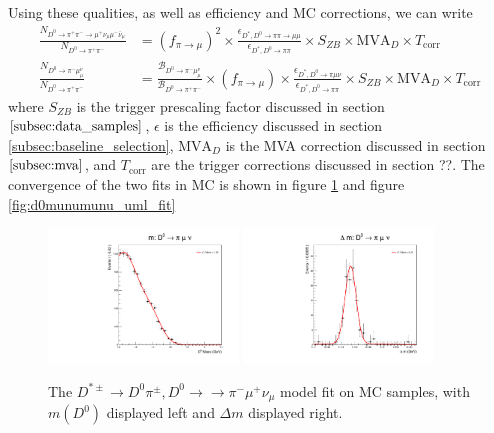 Using these qualities, as well as efficiency and MC corrections, we can write
\begin{equation}
\begin{split}
    \frac{N_{D^0 \to \pi^+ \pi^- \to \mu^+ \nu_\mu \mu^- \bar{\nu}_\mu}}{N_{D^0 \to \pi^+ \pi^-}} &= \left(f_{\pi \to \mu}\right)^2 \times \frac{\epsilon_{D^*, D^0\to\pi\pi\to\mu\mu}}{\epsilon_{D^*, D^0\to\pi\pi}} \times S_{ZB} \times \text{MVA}_D \times T_{\text{corr}} \\
    \frac{N_{D^0 \to \pi^- \mu^ \nu_\mu}}{N_{D^0 \to \pi^+ \pi^-}} &=\frac{\mathcal{B}_{D^0 \to \pi^- \mu^ \nu_\mu}}{\mathcal{B}_{D^0 \to \pi^+ \pi^-}} \times \left(f_{\pi \to \mu}\right) \times \frac{\epsilon_{D^*, D^0\to\pi\mu\nu}}{\epsilon_{D^*, D^0\to\pi\pi}} \times S_{ZB} \times \text{MVA}_D \times T_{\text{corr}}
    \label{eq:peaking_background_yield_calculation}
\end{split}
\end{equation}
where $S_{ZB}$ is the trigger prescaling factor discussed in section $\ref{subsec:data_samples}$, $\epsilon$ is the efficiency discussed in section \ref{subsec:baseline_selection}, $\text{MVA}_D$ is the MVA correction discussed in section $\ref{subsec:mva}$, and $T_{\text{corr}}$ are the trigger corrections discussed in section ??. The convergence of the two fits in MC is shown in figure \ref{fig:d0pimunu_uml_fit} and figure \ref{fig:d0munumunu_uml_fit}


\begin{figure}[htp]
    \begin{center}
      \includegraphics[width=0.45\textwidth]{figures/chapter4/signal_fit/d0pimunu_2022_2023_0_m.pdf}
      \includegraphics[width=0.45\textwidth]{figures/chapter4/signal_fit/d0pimunu_2022_2023_0_dm.pdf}\\
    \end{center}
    \caption{
      The $D^{*\pm} \to D^0\pi^\pm, D^0 \to \to \pi^- \mu^+ \nu_\mu$ model fit on MC samples, with $m(D^0)$ displayed left and $\Delta m$ displayed right.
    }
    \label{fig:d0pimunu_uml_fit}
\end{figure}

